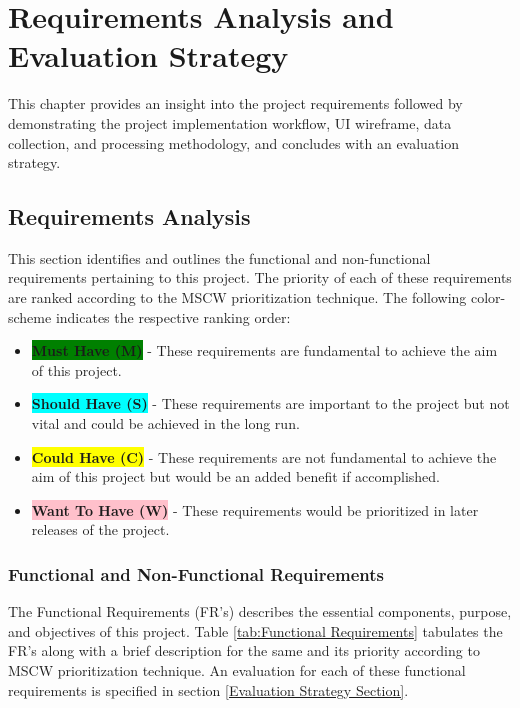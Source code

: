 
\chapter{Requirements Analysis and Evaluation Strategy} %
\label{Requirements Analysis}
\label{ChapterX} %


This chapter provides an insight into the project requirements followed by demonstrating the project implementation workflow, UI wireframe, data collection, and processing methodology, and concludes with an evaluation strategy.

\section{Requirements Analysis}
This section identifies and outlines the functional and non-functional requirements pertaining to this project. The priority 
of each of these requirements are ranked according to the MSCW prioritization technique. The following color-scheme 
indicates the respective ranking order:

\begin{itemize}
  \item \colorbox{green}{\textbf{Must Have (M)}} - These requirements are fundamental to achieve the aim of this project.
  \item \colorbox{cyan}{\textbf{Should Have (S)}} - These requirements are important to the project but not vital and could be achieved in the long run.
  \item \colorbox{yellow}{\textbf{Could Have (C)}} - These requirements are not fundamental to achieve the aim of this project but would be an added benefit if accomplished.
  \item \colorbox{pink}{\textbf{Want To Have (W)}} - These requirements would be prioritized in later releases of the project.
\end{itemize}

\subsection{Functional and Non-Functional Requirements}
The Functional Requirements (FR's) describes the essential components, purpose, and objectives of this project.
Table \ref{tab:Functional Requirements} tabulates the FR's along with a brief description for the same and its priority according to MSCW prioritization technique. An evaluation 
for each of these functional requirements is specified in section \ref{Evaluation Strategy Section}.

